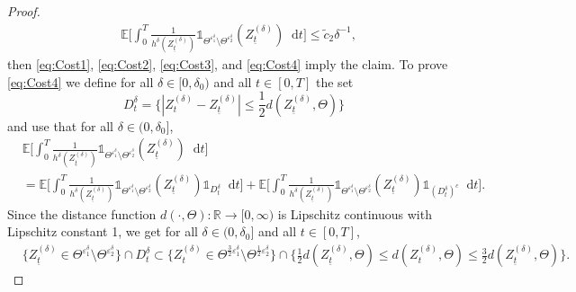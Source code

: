 \documentclass[11pt,a4paper]{article}
\numberwithin{equation}{section}
\theoremstyle{definition}
\newcommand{\E}{{\mathbb{E}}}
\newcommand{\R}{{\mathbb{R}}}
\newcommand{\diff}{\mathop{}\!\mathrm{d}}
\begin{document}
\begin{proof}
    \begin{equation}\label{eq:Cost4}
        \begin{aligned}
            &\E\Big[ \int_0^T  \frac{1}{h^\delta(Z^{(\delta)}_{\underline t})} \mathds{1}_{\Theta^{\varepsilon_1^\delta}\setminus\Theta^{\varepsilon_2^\delta} }(Z^{(\delta)}_{\underline t}) \diff t\Big] 
            \leq \widetilde  c_2 \delta^{-1},
        \end{aligned}
    \end{equation}  
    then \eqref{eq:Cost1}, \eqref{eq:Cost2}, \eqref{eq:Cost3}, and \eqref{eq:Cost4} imply the claim.
    To prove \eqref{eq:Cost4} we define for all $\delta\in[0,\delta_0)$ and all $t\in[0,T]$ the set 
    \begin{equation}\label{eq:Cost5}
        D_t^{\delta} = \Big\{| Z^{(\delta)}_t- Z^{(\delta)}_{\underline t}| \leq \frac{1}{2} d(Z^{(\delta)}_{\underline t},\Theta) \Big\}
    \end{equation}
    and use that for all $\delta\in(0,\delta_0]$,
    \begin{equation}\label{eq:Cost6}
        \begin{aligned}
            &\E\Big[ \int_0^T  \frac{1}{h^\delta(Z^{(\delta)}_{\underline t})} \mathds{1}_{\Theta^{\varepsilon_1^\delta}\setminus\Theta^{\varepsilon_2^\delta} }(Z^{(\delta)}_{\underline t}) \diff t\Big] \\
            &= \E\Big[ \int_0^T  \frac{1}{h^\delta(Z^{(\delta)}_{\underline t})} \mathds{1}_{\Theta^{\varepsilon_1^\delta}\setminus\Theta^{\varepsilon_2^\delta} }(Z^{(\delta)}_{\underline t})\mathds{1}_{D_t^{\delta}} \diff t\Big]
            + \E\Big[ \int_0^T  \frac{1}{h^\delta(Z^{(\delta)}_{\underline t})} \mathds{1}_{\Theta^{\varepsilon_1^\delta}\setminus\Theta^{\varepsilon_2^\delta} }(Z^{(\delta)}_{\underline t}) \mathds{1}_{(D_t^{\delta})^c}\diff t\Big].
        \end{aligned}
    \end{equation}  
    Since the distance function $d(\cdot, \Theta)\colon\R\to [0, \infty)$ is Lipschitz continuous with Lipschitz constant 1, we get for all $\delta\in(0,\delta_0]$ and all $t\in[0,T]$,
    \begin{equation}\label{eq:Cost7}
        \begin{aligned}
            &\{Z^{(\delta)}_{\underline t}\in \Theta^{\varepsilon_1^\delta}\setminus\Theta^{\varepsilon_2^\delta}\} \cap D_t^\delta \subset \{ Z^{(\delta)}_{t} \in \Theta^{\frac{3}{2}\varepsilon_1^\delta}\setminus\Theta^{\frac{1}{2}\varepsilon_2^\delta}\} \cap \Big\{ \frac{1}{2}d(Z^{(\delta)}_{\underline t}, \Theta)\leq d(Z^{(\delta)}_{t}, \Theta)\leq \frac{3}{2}d(Z^{(\delta)}_{\underline t}, \Theta) \Big\}.

\end{aligned}
\end{equation}
\end{proof}
\end{document}
